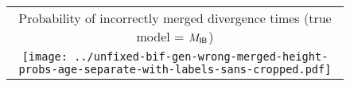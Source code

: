 \documentclass[border=10pt,varwidth=30cm]{standalone}
\newcommand{\bimodel}{\ensuremath{M_{\textrm{\sffamily IB}}}\xspace}
\begin{document}
\begin{figure}
    \setlength\arrayrulewidth{2pt}
    \centering
    \begin{tabular}{@{}c@{}}
        {\large Probability of incorrectly merged divergence times (true model = \bimodel)} \\[0.5ex]
        \texttt{[image: ../unfixed-bif-gen-wrong-merged-height-probs-age-separate-with-labels-sans-cropped.pdf]} \\
    \end{tabular}
\end{figure}
\end{document}
